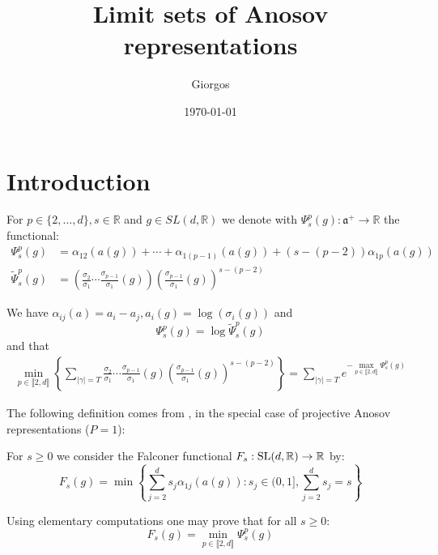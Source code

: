 \documentclass{report}
\title{Limit sets of Anosov representations}
\author{Giorgos}
\date{\today}
\begin{document}
\maketitle

\tableofcontents

\chapter{Introduction}
\begin{definition}
For $p \in \{2, \ldots, d\}, s\in \mathbb R $
and $g \in SL(d, \mathbb R)$ 
we denote with $\Psi_s^p(g): \mathfrak a ^+ \to \mathbb R$ the functional:
\begin{align*}
\Psi_s^p(g) &= 
    \alpha_{12}(a(g)) + \cdots + \alpha_{1(p-1)}(a(g)) + (s - (p-2))\alpha_{1p}(a(g))\\
\tilde \Psi_s^p(g) &= 
    \left( \frac{\sigma_2}{\sigma_1}\cdots\frac{\sigma_{p-1}}{\sigma_1}(g)\right) 
    \left( \frac{\sigma_{p-1}}{\sigma_1}(g) \right)^{s - (p-2)}
\end{align*}
\end{definition}
\begin{remark}
    We have $\alpha_{ij}(a) = a_i - a_j, a_i(g) = \log (\sigma_i(g))$ and 
    \[
        \Psi_s^p(g) = \log \tilde \Psi_s^p(g)
    \]
and that
\begin{align*}
    \min_{p \in \llbracket 2, d \rrbracket} 
    \left\{ 
        \sum_{|\gamma| = T} 
            \frac{\sigma_2}{\sigma_1}\cdots\frac{\sigma_{p-1}}{\sigma_1}(g) 
            \left( \frac{\sigma_{p-1}}{\sigma_1}(g) \right)^{s - (p-2)}
    \right\} = 
    \sum_{|\gamma| = T} e^{-\max\limits_{p \in \llbracket 2, d \rrbracket} \Psi_s^p(g)}
\end{align*}
\end{remark}

The following definition comes from \cite{ledrappier_dimension_2023}, in the special case of projective Anosov representations ($P = {1}$):
\begin{definition}
    For $s \geq 0$ we consider the Falconer functional $F_s : \operatorname{{\mathrm{SL}}}(d, \mathbb R) \to \mathbb R$ by:
    \[
        F_s(g) = \min 
        \left\{
            \sum_{j=2}^d s_j \alpha_{1j}(a(g)) : s_j \in (0,1], \sum_{j=2}^d s_j = s 
        \right\}
    \]
\end{definition}

\begin{remark}
    Using elementary computations one may prove that for all $s \geq 0$:
    \[
        F_s(g) = \min_{p \in \llbracket 2, d \rrbracket} \Psi_s^p(g)
    \]
\end{remark}
\end{document}
